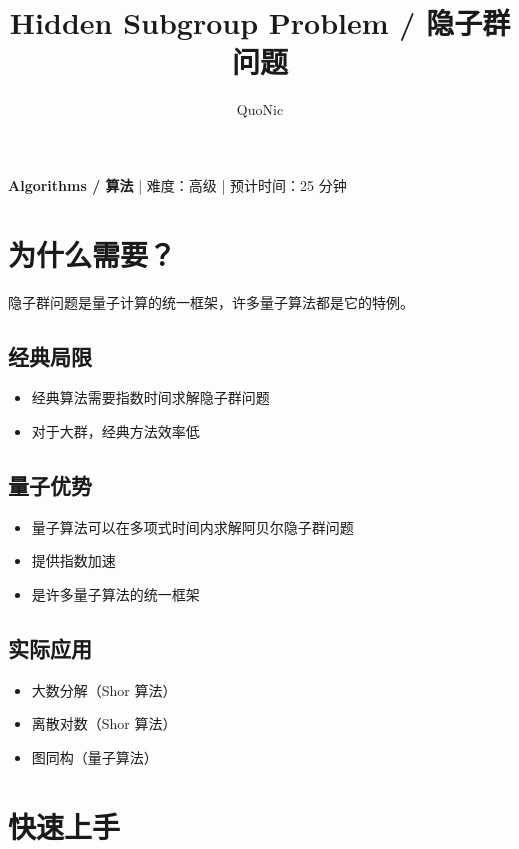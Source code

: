 \documentclass[12pt,a4paper]{article}
\title{Hidden Subgroup Problem / 隐子群问题}
\author{QuoNic}
\date{}
\begin{document}
\maketitle

\begin{center}
\textbf{Algorithms / 算法} | 难度：高级 | 预计时间：25 分钟
\end{center}

\tableofcontents
\newpage

\section{为什么需要？}

隐子群问题是量子计算的统一框架，许多量子算法都是它的特例。

\subsection{经典局限}
\begin{itemize}
  \item 经典算法需要指数时间求解隐子群问题
  \item 对于大群，经典方法效率低
\end{itemize}

\subsection{量子优势}
\begin{itemize}
  \item 量子算法可以在多项式时间内求解阿贝尔隐子群问题
  \item 提供指数加速
  \item 是许多量子算法的统一框架
\end{itemize}

\subsection{实际应用}
\begin{itemize}
  \item 大数分解（Shor 算法）
  \item 离散对数（Shor 算法）
  \item 图同构（量子算法）
\end{itemize}

\section{快速上手}
\end{document}
